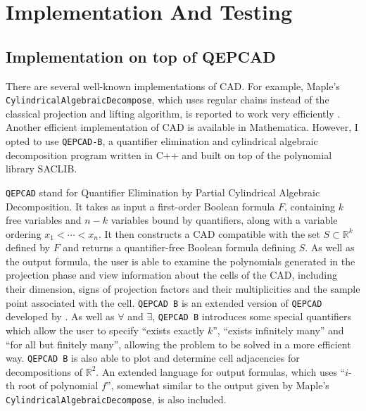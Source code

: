\documentclass[
]{book}
\theoremstyle{definition}
\theoremstyle{definition}
\theoremstyle{definition}
\theoremstyle{definition}
\theoremstyle{remark}
\begin{document}
\hypertarget{sec:implementation-and-testing}{%
\chapter{Implementation And Testing}\label{sec:implementation-and-testing}}

\hypertarget{implementation-on-top-of-qepcad}{%
\section{Implementation on top of QEPCAD}\label{implementation-on-top-of-qepcad}}

There are several well-known implementations of CAD. For example, Maple's \texttt{CylindricalAlgebraicDecompose}, which uses regular chains instead of the classical projection and lifting algorithm, is reported to work very efficiently \citep{chen2014}. Another efficient implementation of CAD is available in Mathematica. However, I opted to use \texttt{QEPCAD-B}, a quantifier elimination and cylindrical algebraic decomposition program written in C++ and built on top of the polynomial library SACLIB.

\texttt{QEPCAD} stand for Quantifier Elimination by Partial Cylindrical Algebraic Decomposition. It takes as input a first-order Boolean formula \(F\), containing \(k\) free variables and \(n-k\) variables bound by quantifiers, along with a variable ordering \(x_1 < \cdots < x_n\). It then constructs a CAD compatible with the set \(S \subset \mathbb{R}^k\) defined by \(F\) and returns a quantifier-free Boolean formula defining \(S\). As well as the output formula, the user is able to examine the polynomials generated in the projection phase and view information about the cells of the CAD, including their dimension, signs of projection factors and their multiplicities and the sample point associated with the cell. \texttt{QEPCAD\ B} is an extended version of \texttt{QEPCAD} developed by \citet{brownQepcad}.
As well as \(\forall\) and \(\exists\), \texttt{QEPCAD\ B} introduces some special quantifiers which allow the user to specify ``exists exactly \(k\)'', ``exists infinitely many'' and ``for all but finitely many'', allowing the problem to be solved in a more efficient way. \texttt{QEPCAD\ B} is also able to plot and determine cell adjacencies for decompositions of \(\mathbb{R}^2\). An extended language for output formulas, which uses ``\(i\)-th root of polynomial \(f\)'', somewhat similar to the output given by Maple's \texttt{CylindricalAlgebraicDecompose}, is also included.
\end{document}

